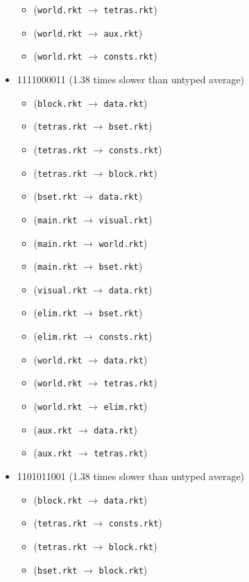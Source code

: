 \documentclass{article}
\newcommand{\mono}[1]{\texttt{#1}}
\begin{document}
\begin{itemize}
\begin{itemize}
  \item (\mono{world.rkt} $\rightarrow$ \mono{tetras.rkt})
  \item (\mono{world.rkt} $\rightarrow$ \mono{aux.rkt})
  \item (\mono{world.rkt} $\rightarrow$ \mono{consts.rkt})
  \end{itemize}
\item 1111000011 (1.38 times slower than untyped average)
  \begin{itemize}
  \item (\mono{block.rkt} $\rightarrow$ \mono{data.rkt})
  \item (\mono{tetras.rkt} $\rightarrow$ \mono{bset.rkt})
  \item (\mono{tetras.rkt} $\rightarrow$ \mono{consts.rkt})
  \item (\mono{tetras.rkt} $\rightarrow$ \mono{block.rkt})
  \item (\mono{bset.rkt} $\rightarrow$ \mono{data.rkt})
  \item (\mono{main.rkt} $\rightarrow$ \mono{visual.rkt})
  \item (\mono{main.rkt} $\rightarrow$ \mono{world.rkt})
  \item (\mono{main.rkt} $\rightarrow$ \mono{bset.rkt})
  \item (\mono{visual.rkt} $\rightarrow$ \mono{data.rkt})
  \item (\mono{elim.rkt} $\rightarrow$ \mono{bset.rkt})
  \item (\mono{elim.rkt} $\rightarrow$ \mono{consts.rkt})
  \item (\mono{world.rkt} $\rightarrow$ \mono{data.rkt})
  \item (\mono{world.rkt} $\rightarrow$ \mono{tetras.rkt})
  \item (\mono{world.rkt} $\rightarrow$ \mono{elim.rkt})
  \item (\mono{aux.rkt} $\rightarrow$ \mono{data.rkt})
  \item (\mono{aux.rkt} $\rightarrow$ \mono{tetras.rkt})
  \end{itemize}
\item 1101011001 (1.38 times slower than untyped average)
  \begin{itemize}
  \item (\mono{block.rkt} $\rightarrow$ \mono{data.rkt})
  \item (\mono{tetras.rkt} $\rightarrow$ \mono{consts.rkt})
  \item (\mono{tetras.rkt} $\rightarrow$ \mono{block.rkt})
  \item (\mono{bset.rkt} $\rightarrow$ \mono{block.rkt})

\end{itemize}
\end{itemize}
\end{document}
